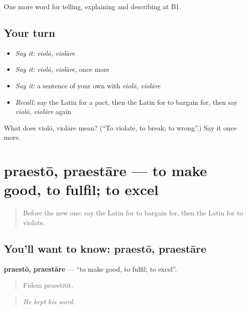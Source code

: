 \begin{grammarlens}[title={What you've built}]
One more word for telling, explaining and describing at B1.
\end{grammarlens}

\subsection*{Your turn}
\begin{itemize}
\raggedright
  \item \emph{Say it:} \emph{violō, violāre}
  \item \emph{Say it:} \emph{violō, violāre}, once more
  \item \emph{Say it:} a sentence of your own with \emph{violō, violāre}
  \item \emph{Recall:} say the Latin for a pact, then the Latin for to bargain for, then say \emph{violō, violāre} again
\end{itemize}

\begin{tcolorbox}[breakable,colback=teal!4,colframe=teal!35!black,title={Before you move on}]
What does violō, violāre mean? (\textquotedblleft{}To violate, to break; to wrong\textquotedblright{}.) Say it once more.
\end{tcolorbox}
\section[praestō, praestāre]{praestō, praestāre — to make good, to fulfil; to excel}

\label{lesson:LA-C398-praesto}



\begin{quote}
Before the new one: say the Latin for to bargain for, then the Latin for to violate.
\end{quote}

\subsection*{You'll want to know: praestō, praestāre}
\textbf{praestō, praestāre} — \textquotedblleft{}to make good, to fulfil; to excel\textquotedblright{}.

\begin{quote}
Fidem praestitit.
\end{quote}

\begin{quote}
\emph{He kept his word.}
\end{quote}

